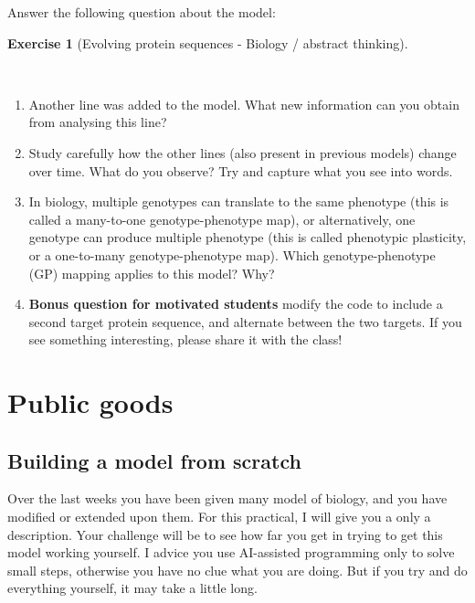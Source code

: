 \documentclass[
  letterpaper,
  DIV=11,
  numbers=noendperiod]{scrreprt}
\providecommand{\tightlist}{%
  \setlength{\itemsep}{0pt}\setlength{\parskip}{0pt}}\usepackage{longtable,booktabs,array}
\theoremstyle{definition}
\newtheorem{exercise}{Exercise}[chapter]
\theoremstyle{remark}
\begin{document}
Answer the following question about the model:

\begin{exercise}[Evolving protein sequences - Biology / abstract
thinking]\protect\hypertarget{exr-evolving-proteins}{}\label{exr-evolving-proteins}

~

\begin{enumerate}
\def\labelenumi{\alph{enumi}.}
\tightlist
\item
  Another line was added to the model. What new information can you
  obtain from analysing this line?
\item
  Study carefully how the other lines (also present in previous models)
  change over time. What do you observe? Try and capture what you see
  into words.
\item
  In biology, multiple genotypes can translate to the same phenotype
  (this is called a many-to-one genotype-phenotype map), or
  alternatively, one genotype can produce multiple phenotype (this is
  called phenotypic plasticity, or a one-to-many genotype-phenotype
  map). Which genotype-phenotype (GP) mapping applies to this model?
  Why?
\item
  \textbf{Bonus question for motivated students} modify the code to
  include a second target protein sequence, and alternate between the
  two targets. If you see something interesting, please share it with
  the class!
\end{enumerate}

\end{exercise}

\chapter{Public goods}\label{public-goods}

\section{Building a model from
scratch}\label{building-a-model-from-scratch}

Over the last weeks you have been given many model of biology, and you
have modified or extended upon them. For this practical, I will give you
a only a description. Your challenge will be to see how far you get in
trying to get this model working yourself. I advice you use AI-assisted
programming only to solve small steps, otherwise you have no clue what
you are doing. But if you try and do everything yourself, it may take a
little long.
\end{document}
